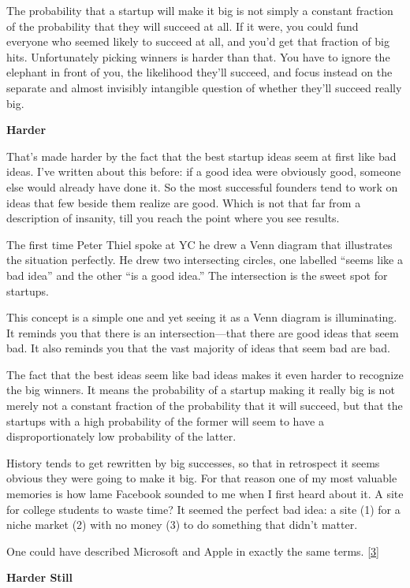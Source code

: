 The probability that a startup will make it big is not simply a constant
fraction of the probability that they will succeed at all. If it were,
you could fund everyone who seemed likely to succeed at all, and you'd
get that fraction of big hits. Unfortunately picking winners is harder
than that. You have to ignore the elephant in front of you, the
likelihood they'll succeed, and focus instead on the separate and almost
invisibly intangible question of whether they'll succeed really big.

\textbf{Harder}

That's made harder by the fact that the best startup ideas seem at first
like bad ideas. I've written about this before: if a good idea were
obviously good, someone else would already have done it. So the most
successful founders tend to work on ideas that few beside them realize
are good. Which is not that far from a description of insanity, till you
reach the point where you see results.

The first time Peter Thiel spoke at YC he drew a Venn diagram that
illustrates the situation perfectly. He drew two intersecting circles,
one labelled ``seems like a bad idea'' and the other ``is a good idea.''
The intersection is the sweet spot for startups.

This concept is a simple one and yet seeing it as a Venn diagram is
illuminating. It reminds you that there is an intersection---that there
are good ideas that seem bad. It also reminds you that the vast majority
of ideas that seem bad are bad.

The fact that the best ideas seem like bad ideas makes it even harder to
recognize the big winners. It means the probability of a startup making
it really big is not merely not a constant fraction of the probability
that it will succeed, but that the startups with a high probability of
the former will seem to have a disproportionately low probability of the
latter.

History tends to get rewritten by big successes, so that in retrospect
it seems obvious they were going to make it big. For that reason one of
my most valuable memories is how lame Facebook sounded to me when I
first heard about it. A site for college students to waste time? It
seemed the perfect bad idea: a site (1) for a niche market (2) with no
money (3) to do something that didn't matter.

One could have described Microsoft and Apple in exactly the same terms.
{[}\hyperref[f3n]{3}{]}

\textbf{Harder Still}

